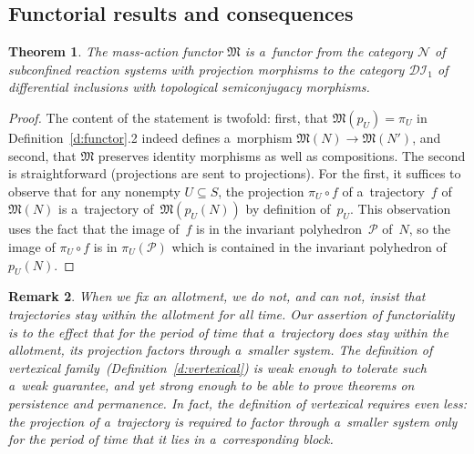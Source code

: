 \documentclass[pdftex]{sigma}
\newtheorem{Theorem}{Theorem}[section]
\newtheorem{Remark}[Theorem]{Remark}
\begin{document}
\subsection{Functorial results and consequences}
\label{subsec:functor}
\begin{Theorem}
\label{thm:functor}
The mass-action functor $\mathfrak M$ is a~functor from the category $\mathcal N$ of subconfined reaction systems
with projection morphisms to the category $\mathcal{DI}_1$ of differential inclusions with topological semiconjugacy
morphisms.
\end{Theorem}
\begin{proof}
The content of the statement is twofold: f\/irst, that $\mathfrak M(p_U)=\pi_U$ in Def\/inition~\ref{d:functor}.2
indeed def\/ines a~morphism $\mathfrak M(N)\to\mathfrak M(N')$, and second, that $\mathfrak M$ preserves identity
morphisms as well as compositions.
The second is straightforward (projections are sent to projections).
For the f\/irst, it suf\/f\/ices to observe that for any nonempty $U\subseteq S$, the projection $\pi_U\circ f$ of
a~trajectory~$f$ of~$\mathfrak M(N)$ is a~trajectory of~$\mathfrak M(p_U(N))$ by def\/inition of~$p_U$.
This observation uses the fact that the image of~$f$ is in the invariant polyhedron~$\mathcal P$ of~$N$, so the image
of $\pi_U\circ f$ is in $\pi_U(\mathcal P)$ which is contained in the invariant polyhedron  of~$p_U(N)$.
\end{proof}
\begin{Remark}
\label{rem:allotvxical}
When we f\/ix an allotment, we do not, and can not, insist that trajectories stay within the allotment for all time.
Our assertion of functoriality is to the ef\/fect that for the period of time that a~trajectory does stay within the
allotment, its projection factors through a~smaller system.
The def\/inition of vertexical family~(Def\/inition~\ref{d:vertexical}) is weak enough to tolerate such a~weak
guarantee, and yet strong enough to be able to prove theorems on persistence and permanence.
In fact, the def\/inition of vertexical requires even less: the projection of a~trajectory is required to factor
through a~smaller system only for the period of time that it lies in a~corresponding block.
\end{Remark}
\end{document}
